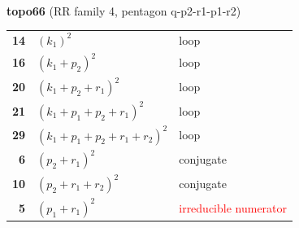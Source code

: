\documentclass[10pt]{article}
\begin{document}
\begin{minipage}[t]{0.48\textwidth}
{}\\[2mm]\textbf{topo66} (RR family 4, pentagon q-p2-r1-p1-r2)\\[2pt]{\footnotesize\begin{tabular}{@{}r@{\ \ }l@{\ \ }l@{}}\textbf{14} & $(k_1)^2$ & loop\\
\textbf{16} & $(k_1+p_2)^2$ & loop\\
\textbf{20} & $(k_1+p_2+r_1)^2$ & loop\\
\textbf{21} & $(k_1+p_1+p_2+r_1)^2$ & loop\\
\textbf{29} & $(k_1+p_1+p_2+r_1+r_2)^2$ & loop\\
\textbf{6} & $(p_2+r_1)^2$ & conjugate\\
\textbf{10} & $(p_2+r_1+r_2)^2$ & conjugate\\
\textbf{5} & $(p_1+r_1)^2$ & \textcolor{red}{irreducible numerator}\\\end{tabular}}\end{minipage}

\bigskip
\end{document}
